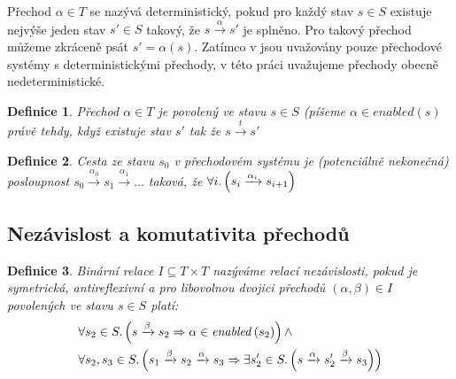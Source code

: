 \documentclass[12pt]{fithesis2}
\newtheorem{definition}{Definice}
\begin{document}
Přechod $\alpha \in T$ se nazývá deterministický, pokud pro každý stav $s \in S$ existuje nejvýše jeden stav $s\prime \in S$ takový, že $s \xrightarrow{\alpha} s\prime$ je splněno. Pro takový přechod můžeme zkráceně psát $s\prime = \alpha(s)$. Zatímco v \cite{CLARKE} jsou uvažovány pouze přechodové systémy s deterministickými přechody, v této práci uvažujeme přechody obecně nedeterministické.


\begin{definition}
Přechod $\alpha \in T$ je povolený ve stavu $s \in S$ (píšeme $\alpha \in \mathit{enabled}(s)$ právě tehdy, když existuje stav $s'$ tak že $s \xrightarrow{t} s'$
\end{definition}

\begin{definition}
Cesta ze stavu $s_0$ v přechodovém systému je (potenciálně nekonečná) posloupnost $s_0 \xrightarrow{\alpha_0} s_1 \xrightarrow{\alpha_1} \ldots $ taková, že $\forall i \ldotp \left({ s_i \xrightarrow{\alpha_i} s_{i+1} }\right)$
\end{definition}

\subsection{Nezávislost a komutativita přechodů}

\begin{definition}
Binární relace $I \subseteq T \times T$ nazýváme relací nezávislosti, pokud je symetrická, antireflexivní a pro libovolnou dvojici přechodů $(\alpha, \beta) \in I$ povolených ve stavu $s \in S$ platí:
\begin{equation}\label{eq:independent-my}
\begin{split}
&\forall s_2 \in S \ldotp
\left({
	s \xrightarrow{\beta} s_2
	\Rightarrow
	\alpha \in \mathit{enabled}\left({s_2}\right)
}\right)
\land \\
&\forall s_2, s_3 \in S \ldotp \left({
	s_1 \xrightarrow{\beta} s_2 \xrightarrow{\alpha} s_3
	\Rightarrow
	\exists s_2' \in S \ldotp \left({
		s \xrightarrow{\alpha} s_2' \xrightarrow{\beta} s_3
	}\right)
}\right)
\end{split}
\end{equation}
\end{definition}
\end{document}
